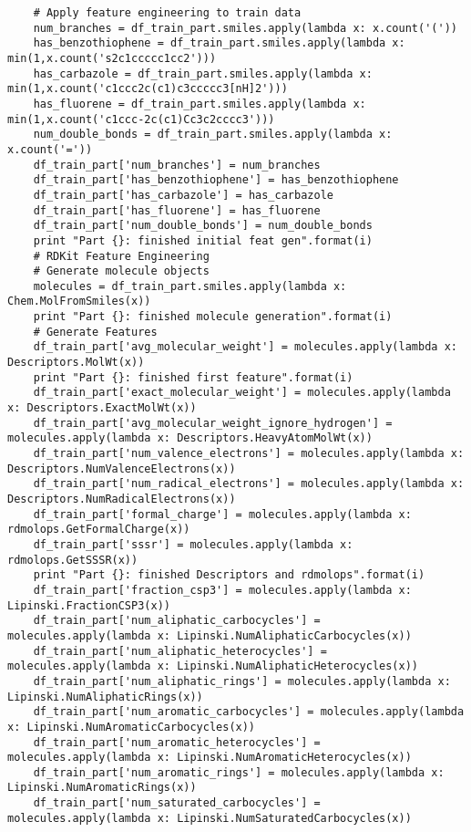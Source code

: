 \documentclass[11pt, oneside]{article}   	%
\begin{document}
\begin{lstlisting}
    # Apply feature engineering to train data
    num_branches = df_train_part.smiles.apply(lambda x: x.count('('))
    has_benzothiophene = df_train_part.smiles.apply(lambda x: min(1,x.count('s2c1ccccc1cc2')))
    has_carbazole = df_train_part.smiles.apply(lambda x: min(1,x.count('c1ccc2c(c1)c3ccccc3[nH]2')))
    has_fluorene = df_train_part.smiles.apply(lambda x: min(1,x.count('c1ccc-2c(c1)Cc3c2cccc3')))
    num_double_bonds = df_train_part.smiles.apply(lambda x: x.count('='))
    df_train_part['num_branches'] = num_branches
    df_train_part['has_benzothiophene'] = has_benzothiophene
    df_train_part['has_carbazole'] = has_carbazole
    df_train_part['has_fluorene'] = has_fluorene
    df_train_part['num_double_bonds'] = num_double_bonds
    print "Part {}: finished initial feat gen".format(i)
    # RDKit Feature Engineering
    # Generate molecule objects
    molecules = df_train_part.smiles.apply(lambda x: Chem.MolFromSmiles(x))
    print "Part {}: finished molecule generation".format(i)
    # Generate Features
    df_train_part['avg_molecular_weight'] = molecules.apply(lambda x: Descriptors.MolWt(x))
    print "Part {}: finished first feature".format(i)
    df_train_part['exact_molecular_weight'] = molecules.apply(lambda x: Descriptors.ExactMolWt(x))
    df_train_part['avg_molecular_weight_ignore_hydrogen'] = molecules.apply(lambda x: Descriptors.HeavyAtomMolWt(x))
    df_train_part['num_valence_electrons'] = molecules.apply(lambda x: Descriptors.NumValenceElectrons(x))
    df_train_part['num_radical_electrons'] = molecules.apply(lambda x: Descriptors.NumRadicalElectrons(x))
    df_train_part['formal_charge'] = molecules.apply(lambda x: rdmolops.GetFormalCharge(x))
    df_train_part['sssr'] = molecules.apply(lambda x: rdmolops.GetSSSR(x))
    print "Part {}: finished Descriptors and rdmolops".format(i)
    df_train_part['fraction_csp3'] = molecules.apply(lambda x: Lipinski.FractionCSP3(x))
    df_train_part['num_aliphatic_carbocycles'] = molecules.apply(lambda x: Lipinski.NumAliphaticCarbocycles(x))
    df_train_part['num_aliphatic_heterocycles'] = molecules.apply(lambda x: Lipinski.NumAliphaticHeterocycles(x))
    df_train_part['num_aliphatic_rings'] = molecules.apply(lambda x: Lipinski.NumAliphaticRings(x))
    df_train_part['num_aromatic_carbocycles'] = molecules.apply(lambda x: Lipinski.NumAromaticCarbocycles(x))
    df_train_part['num_aromatic_heterocycles'] = molecules.apply(lambda x: Lipinski.NumAromaticHeterocycles(x))
    df_train_part['num_aromatic_rings'] = molecules.apply(lambda x: Lipinski.NumAromaticRings(x))
    df_train_part['num_saturated_carbocycles'] = molecules.apply(lambda x: Lipinski.NumSaturatedCarbocycles(x))

\end{lstlisting}
\end{document}
